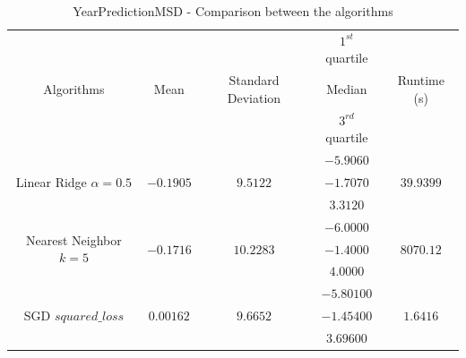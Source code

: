 \begin{table}[p]

	\begin{center}
		\begin{tabular}{|c|c|c|c|c|}
			\hline \multirow{3}{*}{Algorithms} &					&												 & $1^{st}$ quartile & \\
																				 &	Mean 		&		Standard 	Deviation	 & Median						 & Runtime (s)\\
																				 &					&												 & $3^{rd}$ quartile & \\
    	\hline \multirow{3}{*}{Linear Ridge $\alpha=0.5$}&						&						&	$-5.9060$ &\\
																				& $-0.1905$ & $9.5122$  & $-1.7070$ & $39.9399$\\
																										&						&						&	$3.3120$& \\
			\hline \multirow{3}{*}{Nearest Neighbor $k=5$}&						&						&	$-6.0000$ &\\
																				& $-0.1716$ & $10.2283$  & $-1.4000$ & $8070.12$\\
																										&						&						&	$4.0000$& \\
			\hline \multirow{3}{*}{SGD $squared\_loss$}&						&						&	$-5.80100$ &\\
																									& $0.00162$ & $9.6652$  & $-1.45400$ & $1.6416$\\
																										&						&						&	$3.69600$& \\
																										\hline

		\end{tabular}
	\end{center}
	\caption{YearPredictionMSD - Comparison between the algorithms\label{ypmsd:table:conclusion}}
\end{table}

